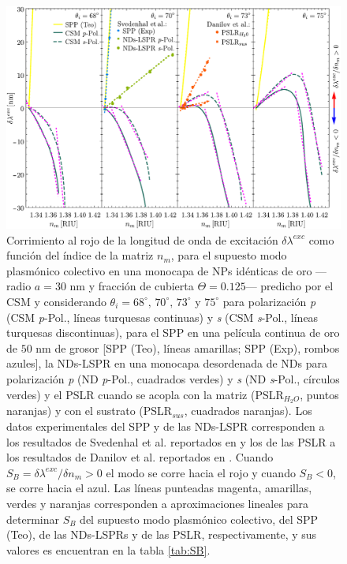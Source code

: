 \begin{figure}[t!]\centering
	\includegraphics[width=\linewidth]{2-Resultados/figs/11-SPPCSM/1_comparacionAugtEye.pdf}\vspace*{-.7em}
	\caption{%
Corrimiento al rojo de la longitud de onda de excitación $\delta\lambda^{exc}$ como función del índice de la matriz $n_m$, para el supuesto modo  plasmónico colectivo en una monocapa de NPs idénticas de oro ---radio $a=30$ nm y fracción de cubierta $\Theta=0.125$--- predicho por el CSM y  considerando $\theta_i=68^\circ,\, 70^\circ,\, 73^\circ$ y $75^\circ$ para polarización  \emph{p} (CSM \textit{p}-Pol., líneas turquesas continuas) y \emph{s} (CSM \textit{s}-Pol., líneas turquesas discontinuas), para el SPP en una película continua de oro de $50$ nm de grosor [SPP (Teo), líneas amarillas; SPP (Exp), rombos azules], la NDs-LSPR  en una monocapa desordenada de NDs para polarización \emph{p} (ND \textit{p}-Pol., cuadrados verdes) y \emph{s} (ND \textit{s}-Pol., círculos verdes) y el PSLR cuando se acopla con la matriz (PSLR$_{H_{2}O}$, puntos naranjas) y con el sustrato (PSLR$_{sus}$, cuadrados naranjas). Los datos experimentales del SPP y de las NDs-LSPR corresponden a los resultados de Svedenhal et al. reportados en \cite{svedendahl2009refractometric} y los de las PSLR a los resultados de Danilov et al. reportados en \cite{danilov2018ultra}. Cuando $S_B=\delta\lambda^{exc}/\delta n_m>0$ el modo se corre hacia el rojo y cuando $S_B<0$, se corre hacia el azul. Las líneas punteadas magenta, amarillas, verdes y naranjas corresponden a aproximaciones lineales para determinar $S_B$ del supuesto modo plasmónico colectivo, del SPP (Teo), de las NDs-LSPRs y de las PSLR, respectivamente, y sus valores es encuentran en la tabla  \ref{tab:SB}.}\label{fig:SensThetai}
	\end{figure}	

